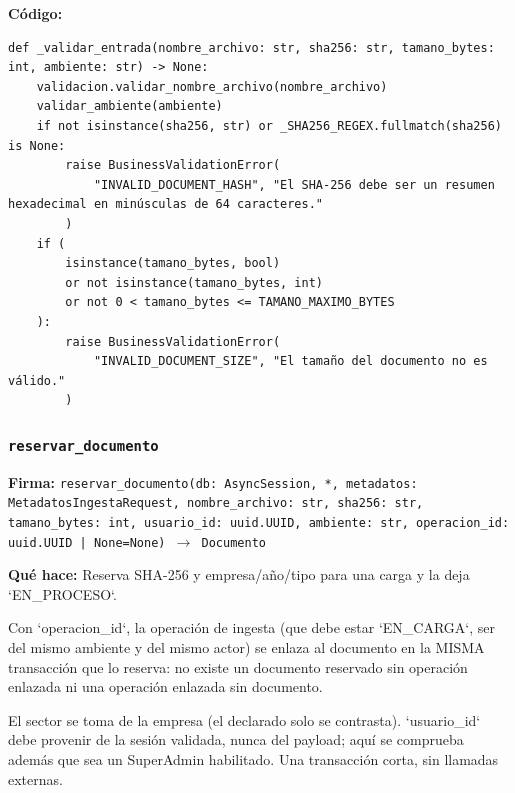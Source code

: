 \documentclass[11pt,a4paper]{article}
\begin{document}
\textbf{Código:}
\begin{lstlisting}
def _validar_entrada(nombre_archivo: str, sha256: str, tamano_bytes: int, ambiente: str) -> None:
    validacion.validar_nombre_archivo(nombre_archivo)
    validar_ambiente(ambiente)
    if not isinstance(sha256, str) or _SHA256_REGEX.fullmatch(sha256) is None:
        raise BusinessValidationError(
            "INVALID_DOCUMENT_HASH", "El SHA-256 debe ser un resumen hexadecimal en minúsculas de 64 caracteres."
        )
    if (
        isinstance(tamano_bytes, bool)
        or not isinstance(tamano_bytes, int)
        or not 0 < tamano_bytes <= TAMANO_MAXIMO_BYTES
    ):
        raise BusinessValidationError(
            "INVALID_DOCUMENT_SIZE", "El tamaño del documento no es válido."
        )
\end{lstlisting}

\subsubsection*{\texttt{reservar\_documento}}
\textbf{Firma:} \texttt{reservar\_documento(db: AsyncSession, *, metadatos: MetadatosIngestaRequest, nombre\_archivo: str, sha256: str, tamano\_bytes: int, usuario\_id: uuid.UUID, ambiente: str, operacion\_id: uuid.UUID | None=None) $\rightarrow$ Documento}

\textbf{Qué hace:} Reserva SHA-256 y empresa/año/tipo para una carga y la deja `EN\_PROCESO`.

Con `operacion\_id`, la operación de ingesta (que debe estar `EN\_CARGA`, ser del mismo ambiente y del mismo
actor) se enlaza al documento en la MISMA transacción que lo reserva: no existe un documento reservado sin
operación enlazada ni una operación enlazada sin documento.

El sector se toma de la empresa (el declarado solo se contrasta). `usuario\_id`
debe provenir de la sesión validada, nunca del payload; aquí se comprueba además
que sea un SuperAdmin habilitado. Una transacción corta, sin llamadas externas.
\end{document}
